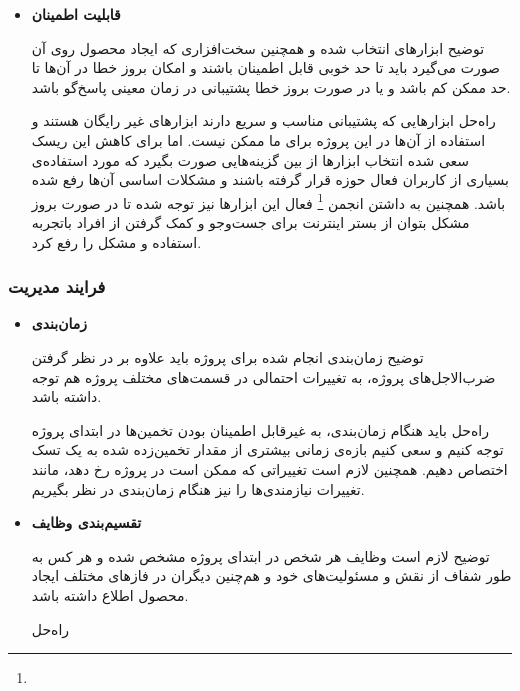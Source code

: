 \begin{itemize}
\item 
\textbf{قابلیت اطمینان}

توضیح \hspace*{1cm} 
ابزارهای انتخاب شده و همچنین سخت‌افزاری که ایجاد محصول روی آن صورت می‌گیرد باید تا حد خوبی قابل اطمینان باشند و امکان بروز خطا در آن‌ها تا حد ممکن کم باشد و یا در صورت بروز خطا پشتیبانی در زمان معینی پاسخ‌گو باشد.

راه‌حل \hspace*{1cm} 
ابزارهایی که پشتیبانی مناسب و سریع دارند ابزارهای غیر رایگان هستند و استفاده از آن‌ها در این پروژه برای ما ممکن نیست. اما برای کاهش این ریسک سعی شده انتخاب ‌ابزارها از بین گزینه‌هایی صورت بگیرد که مورد استفاده‌ی بسیاری از کاربران فعال حوزه قرار گرفته باشند و مشکلات اساسی آن‌ها رفع شده باشد.
همچنین به داشتن انجمن
\footnote{}
فعال این ابزارها نیز توجه شده تا در صورت بروز مشکل بتوان از بستر اینترنت برای جست‌وجو و کمک گرفتن از افراد باتجربه‌ استفاده و مشکل را رفع کرد.
	
\end{itemize}

\subsubsection{فرایند مدیریت}

\begin{itemize}
	
	
\item 
\textbf{زمان‌بندی}

توضیح \hspace*{1cm} 
زمان‌بندی انجام شده برای پروژه باید علاوه بر در نظر گرفتن ضرب‌الاجل‌های پروژه، به تغییرات احتمالی در قسمت‌های مختلف پروژه هم توجه داشته باشد.

راه‌حل \hspace*{1cm} 
باید هنگام زمان‌بندی، به غیرقابل اطمینان بودن تخمین‌ها در ابتدای پروژه توجه کنیم و سعی کنیم بازه‌ی زمانی بیشتری از مقدار تخمین‌زده شده به یک تسک اختصاص دهیم. همچنین لازم است تغییراتی که ممکن است در پروژه رخ دهد، مانند تغییرات نیازمندی‌ها را نیز هنگام زمان‌بندی در نظر بگیریم.


\item 
\textbf{تقسیم‌بندی وظایف‌}

توضیح \hspace*{1cm} 
	لازم است وظایف هر شخص در ابتدای پروژه مشخص شده و هر کس به طور شفاف از نقش و مسئولیت‌های خود و هم‌چنین دیگران در فازهای مختلف ایجاد محصول اطلاع داشته باشد.

راه‌حل \hspace*{1cm} 
	
\end{itemize}


